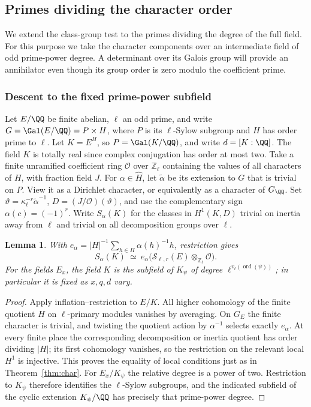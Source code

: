 \documentclass[a4paper,11pt]{article}
\newtheorem{lemma}[proposition]{Lemma}
\theoremstyle{definition}
\theoremstyle{remark}
\newcommand{\ZZ}{\mathbb Z}\newcommand{\ord}{\operatorname{ord}}
\numberwithin{equation}{section}
\newcommand{\Sel}{\mathcal S}
\newcommand{\OO}{\mathcal O}
\begin{document}
\subsection{Primes dividing the character order}\label{nav:III-05}
\label{sec:norm28}

We extend the class-group test to the primes dividing the degree of the full field. For this purpose we take the character components over an intermediate field of odd prime-power degree. A determinant over its Galois group will provide an annihilator even though its group order is zero modulo the coefficient prime.

\subsubsection{Descent to the fixed prime-power subfield}\label{nav:III-06}
Let \(E/\QQ\) be finite abelian, \(\ell\) an odd prime, and write \(G=\Gal(E/\QQ)=P\times H\), where \(P\) is its \(\ell\)-Sylow subgroup and \(H\) has order prime to \(\ell\). Let \(K=E^H\), so \(P=\Gal(K/\QQ)\), and write \(d=[K:\QQ]\). The field \(K\) is totally real since complex conjugation has order at most two. Take a finite unramified coefficient ring \(\OO\) over \(\ZZ_\ell\) containing the values of all characters of \(H\), with fraction field \(J\). For \(\alpha\in\widehat H\), let \(\widetilde\alpha\) be its extension to \(G\) that is trivial on \(P\). View it as a Dirichlet character, or equivalently as a character of \(G_\QQ\). Set \(\vartheta=\kappa_\ell^{-r}\widetilde\alpha^{-1}\), \(D=(J/\OO)(\vartheta)\), and use the complementary sign \(\alpha(c)=(-1)^r\). Write \(S_\alpha(K)\) for the classes in \(H^1(K,D)\) trivial on inertia away from \(\ell\) and trivial on all decomposition groups over \(\ell\).

\begin{lemma}\label{lem:des28}
With \(e_\alpha=|H|^{-1}\sum_{h\in H}\alpha(h)^{-1}h\), restriction gives
\[
 S_\alpha(K)\ \simeq\ e_\alpha\big(\Sel_{\ell,r}(E)\otimes_{\ZZ_\ell}\OO\big).
\]
For the fields \(E_x\), the field \(K\) is the subfield of \(K_\psi\) of degree \(\ell^{v_\ell(\operatorname{ord}(\psi))}\); in particular it is fixed as \(x,q,d\) vary.
\end{lemma}
\begin{proof}
Apply inflation--restriction to \(E/K\). All higher cohomology of the finite quotient \(H\) on \(\ell\)-primary modules vanishes by averaging. On \(G_E\) the finite character is trivial, and twisting the quotient action by \(\alpha^{-1}\) selects exactly \(e_\alpha\). At every finite place the corresponding decomposition or inertia quotient has order dividing \(|H|\); its first cohomology vanishes, so the restriction on the relevant local \(H^1\) is injective. This proves the equality of local conditions just as in Theorem~\ref{thm:char}. For \(E_x/K_\psi\) the relative degree is a power of two. Restriction to \(K_\psi\) therefore identifies the \(\ell\)-Sylow subgroups, and the indicated subfield of the cyclic extension \(K_\psi/\QQ\) has precisely that prime-power degree.
\end{proof}
\end{document}
